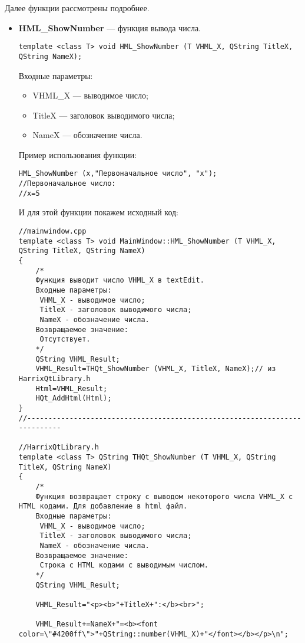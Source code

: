 Далее функции рассмотрены подробнее.

\begin{itemize}
\item \textbf{HML\_ShowNumber} --- функция вывода числа. 
\begin{lstlisting}[label=examplefunction13, caption=Синтаксис функции HML\_ShowNumber]
template <class T> void HML_ShowNumber (T VHML_X, QString TitleX, QString NameX);
\end{lstlisting}
Входные параметры: 
\begin{itemize}   
    \item  VHML\_X --- выводимое число;
     \item TitleX --- заголовок выводимого числа;
     \item NameX --- обозначение числа.
\end{itemize}
Пример использования функции:
\begin{lstlisting}[label=examplefunction10, caption=Пример использования HML\_ShowNumber]
HML_ShowNumber (x,"Первоначальное число", "x");
//Первоначальное число:
//x=5
\end{lstlisting}
И для этой функции покажем исходный код:
\begin{lstlisting}[label=examplefunction11, caption=Реализация функции HML\_ShowNumber]
//mainwindow.cpp
template <class T> void MainWindow::HML_ShowNumber (T VHML_X, QString TitleX, QString NameX)
{
    /*
    Функция выводит число VHML_X в textEdit.
    Входные параметры:
     VHML_X - выводимое число;
     TitleX - заголовок выводимого числа;
     NameX - обозначение числа.
    Возвращаемое значение:
     Отсутствует.
    */
    QString VHML_Result;
    VHML_Result=THQt_ShowNumber (VHML_X, TitleX, NameX);// из HarrixQtLibrary.h
    Html=VHML_Result;
    HQt_AddHtml(Html);
}
//---------------------------------------------------------------------------

//HarrixQtLibrary.h
template <class T> QString THQt_ShowNumber (T VHML_X, QString TitleX, QString NameX)
{
    /*
    Функция возвращает строку с выводом некоторого числа VHML_X с HTML кодами. Для добавление в html файл.
    Входные параметры:
     VHML_X - выводимое число;
     TitleX - заголовок выводимого числа;
     NameX - обозначение числа.
    Возвращаемое значение:
     Строка с HTML кодами с выводимым числом.
    */
    QString VHML_Result;

    VHML_Result="<p><b>"+TitleX+":</b><br>";

    VHML_Result+=NameX+"=<b><font color=\"#4200ff\">"+QString::number(VHML_X)+"</font></b></p>\n";


\end{lstlisting}
\end{itemize}

